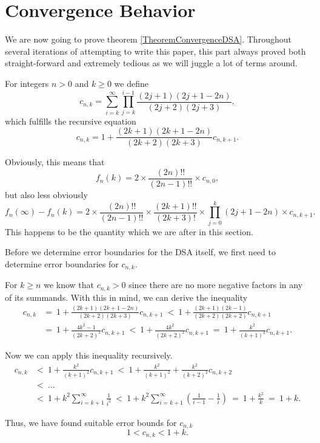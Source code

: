 \documentclass[a4paper,11pt]{scrartcl}
\theoremstyle{definition}
\theoremstyle{plain}
\theoremstyle{remark}
\begin{document}
\section{Convergence Behavior}

We are now going to prove theorem \ref{TheoremConvergenceDSA}.
Throughout several iterations of attempting to write this paper, this part always proved both straight-forward and extremely tedious as we will juggle a lot of terms around.

For integers $n > 0$ and $k \geq 0$ we define
\[
c_{n,k} = \sum_{i=k}^{\infty} \prod_{j=k}^{i-1} \frac{(2j+1)(2j+1-2n)}{(2j+2)(2j+3)},
\]
which fulfills the recursive equation
\[
c_{n,k} = 1 + \frac{(2k+1)(2k+1-2n)}{(2k+2)(2k+3)} c_{n,k+1}.
\]

Obviously, this means that
\[
f_n(k) = 2 \times \frac{(2n)!!}{(2n-1)!!} \times c_{n,0},
\]
but also less obviously
\[
f_n(\infty) - f_n(k) = 2 \times \frac{(2n)!!}{(2n-1)!!} \times \frac{(2k+1)!!}{(2k+3)!} \times \prod_{j=0}^{k}(2j + 1 - 2n) \times c_{n,k+1}.
\]
This happens to be the quantity which we are after in this section.

Before we determine error boundaries for the DSA itself, we first need to determine error boundaries for $c_{n,k}$.

For $k \geq n$ we know that $c_{n,k} > 0$ since there are no more negative factors in any of its summands.
With this in mind, we can derive the inequality
\begin{align*}
c_{n,k}
& = \ 1 + \frac{(2k+1)(2k+1-2n)}{(2k+2)(2k+3)} c_{n,k+1} 
\ < \ 1 + \frac{(2k+1)(2k-1)}{(2k+2)(2k+2)} c_{n,k+1} \\
& = \ 1 + \frac{4k^2 - 1}{(2k+2)^2} c_{n,k+1}
\ < \ 1 + \frac{4k^2}{(2k+2)^2} c_{n,k+1}
\ = \ 1 + \frac{k^2}{(k+1)^2} c_{n,k+1}.
\end{align*}

Now we can apply this inequality recursively.
\begin{align*}
c_{n,k}
& < \ 1 + \frac{k^2}{(k+1)^2} c_{n,k+1}
\ < \ 1 + \frac{k^2}{(k+1)^2} + \frac{k^2}{(k+2)^2} c_{n,k+2} \\
& < \ \dots \\
& < \ 1 + k^2 \sum_{i=k+1}^\infty \frac{1}{i^2} 
\ < \ 1 + k^2 \sum_{i=k+1}^\infty \left(\frac{1}{i-1} - \frac{1}{i}\right)
\ = \ 1 + \frac{k^2}{k}
\ = \ 1 + k.
\end{align*}

Thus, we have found suitable error bounds for $c_{n,k}$
\[
1 < c_{n,k} < 1 + k.
\]
\end{document}
